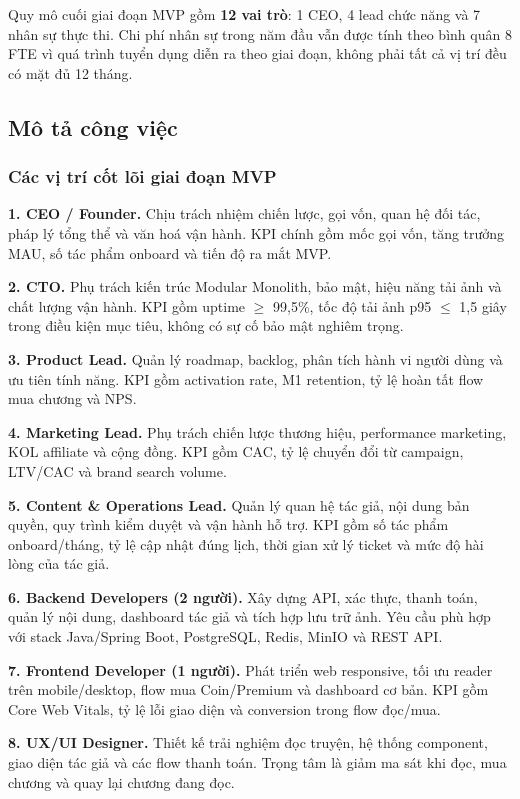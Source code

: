 Quy mô cuối giai đoạn MVP gồm \textbf{12 vai trò}: 1 CEO, 4 lead chức năng và 7 nhân sự thực thi. Chi phí nhân sự trong năm đầu vẫn được tính theo bình quân 8 FTE vì quá trình tuyển dụng diễn ra theo giai đoạn, không phải tất cả vị trí đều có mặt đủ 12 tháng.

\subsection{Mô tả công việc}

\subsubsection{Các vị trí cốt lõi giai đoạn MVP}

\textbf{1. CEO / Founder.} Chịu trách nhiệm chiến lược, gọi vốn, quan hệ đối tác, pháp lý tổng thể và văn hoá vận hành. KPI chính gồm mốc gọi vốn, tăng trưởng MAU, số tác phẩm onboard và tiến độ ra mắt MVP.

\textbf{2. CTO.} Phụ trách kiến trúc Modular Monolith, bảo mật, hiệu năng tải ảnh và chất lượng vận hành. KPI gồm uptime $\geq$ 99{,}5\%, tốc độ tải ảnh p95 $\leq$ 1{,}5 giây trong điều kiện mục tiêu, không có sự cố bảo mật nghiêm trọng.

\textbf{3. Product Lead.} Quản lý roadmap, backlog, phân tích hành vi người dùng và ưu tiên tính năng. KPI gồm activation rate, M1 retention, tỷ lệ hoàn tất flow mua chương và NPS.

\textbf{4. Marketing Lead.} Phụ trách chiến lược thương hiệu, performance marketing, KOL affiliate và cộng đồng. KPI gồm CAC, tỷ lệ chuyển đổi từ campaign, LTV/CAC và brand search volume.

\textbf{5. Content \& Operations Lead.} Quản lý quan hệ tác giả, nội dung bản quyền, quy trình kiểm duyệt và vận hành hỗ trợ. KPI gồm số tác phẩm onboard/tháng, tỷ lệ cập nhật đúng lịch, thời gian xử lý ticket và mức độ hài lòng của tác giả.

\textbf{6. Backend Developers (2 người).} Xây dựng API, xác thực, thanh toán, quản lý nội dung, dashboard tác giả và tích hợp lưu trữ ảnh. Yêu cầu phù hợp với stack Java/Spring Boot, PostgreSQL, Redis, MinIO và REST API.

\textbf{7. Frontend Developer (1 người).} Phát triển web responsive, tối ưu reader trên mobile/desktop, flow mua Coin/Premium và dashboard cơ bản. KPI gồm Core Web Vitals, tỷ lệ lỗi giao diện và conversion trong flow đọc/mua.

\textbf{8. UX/UI Designer.} Thiết kế trải nghiệm đọc truyện, hệ thống component, giao diện tác giả và các flow thanh toán. Trọng tâm là giảm ma sát khi đọc, mua chương và quay lại chương đang đọc.

